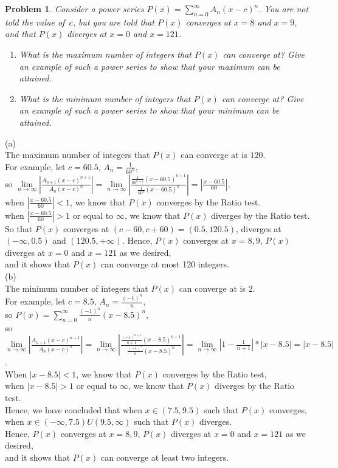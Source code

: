 \documentclass[12pt,reqno]{amsart}
\newtheorem{problem}{Problem}
\begin{document}
\medskip
\begin{problem}
Consider a power series $P(x) = \sum_{n=0}^\infty A_n (x-c)^n$. You are not told the value of~$c$, but you are told that $P(x)$ converges at $x=8$ and $x=9$, and that $P(x)$ diverges at $x=0$ and $x=121$.
\begin{enumerate}
\item What is the maximum number of integers that $P(x)$ can converge at? Give an example of such a power series to show that your maximum can be attained.
\item What is the minimum number of integers that $P(x)$ can converge at? Give an example of such a power series to show that your minimum can be attained.
\end{enumerate}
\end{problem}
(a)
 \\The maximum number of integers that $P(x)$ can converge at is $120$.
 \\For example, let $c=60.5$, $A_{n}=\frac{1}{60^{n}}$,
 \\so $\lim\limits_{n\to\infty}|\frac{ A_{n+1} (x-c)^{n+1}}{ A_n (x-c)^n}|=\lim\limits_{n\rightarrow\infty}|\frac{\frac{1}{60^{n+1}}(x-60.5)^{n+1}}{\frac{1}{60^{n}}(x-60.5)^{n}}|=|\frac{x-60.5}{60}|$, 
 \\when $|\frac{x-60.5}{60}|<1$, we know that $P(x)$ converges by the Ratio test.
 \\when $|\frac{x-60.5}{60}|>1$ or equal to $\infty$, we know that $P(x)$ diverges by the Ratio test.
 \\ So that $P(x)$ converges at $(c-60,c+60)=(0.5,120.5)$, diverges at $(-\infty,0.5)$ and $(120.5,+\infty)$. Hence, $P(x)$ converges at $x=8,9$, $P(x)$ diverges at $x=0$ and $x=121$ as we desired,\\
 and it shows that $P(x)$ can converge at most 120 integers.\\
(b)
\\The minimum number of integers that $P(x)$ can converge at is $2$.
\\For example, let $c=8.5$, $A_{n}=\frac{(-1)^n}{n}$,
\\so $P(x)=\sum_{n=0}^\infty\frac{(-1)^n}{n} (x-8.5)^n$,
\\so $\lim\limits_{n\to\infty}|\frac{ A_{n+1} (x-c)^{n+1}}{ A_n (x-c)^n}|=\lim\limits_{n\rightarrow\infty}|\frac{\frac{(-1)^{n+1}}{n+1} (x-8.5)^{n+1}}{\frac{(-1)^n}{n} (x-8.5)^n}|=\lim\limits_{n\to\infty}|1-\frac{1}{n+1}|*|x-8.5|=|x-8.5|$.
\\When $|x-8.5|<1$, we know that $P(x)$ converges by the Ratio test,
\\when $|x-8.5|>1$ or equal to $\infty$, we know that $P(x)$ diverges by the Ratio test.
\\Hence, we have concluded that when $x\in (7.5,9.5)$ such that $P(x)$ converges,
\\when $x\in (-\infty,7.5)U(9.5,\infty)$ such that $P(x)$ diverges.
\\Hence, $P(x)$ converges at $x=8,9$, $P(x)$ diverges at $x=0$ and $x=121$ as we desired,
\\and it shows that $P(x)$ can converge at least two integers.
\end{document}
